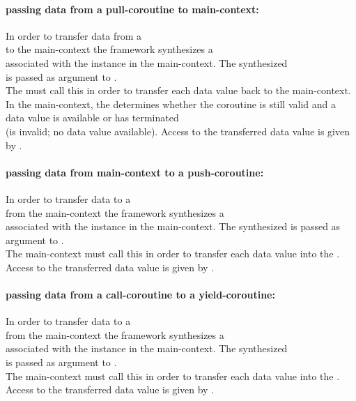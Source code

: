 \paragraph*{passing data from a pull-coroutine to main-context:}
In order to transfer data from a\\
\pullcoro to the main-context the framework synthesizes a\\
\pushcoro associated
with the \pullcoro instance in the main-context. The synthesized\\
\pushcoro is passed as argument to \corofunction.\\
The \corofunction must call this \pushcoroop in order to transfer each
data value back to the main-context.\\
In the main-context, the \pullcorobool determines whether the coroutine is still
valid and a data value is available or \corofunction has terminated\\
(\pullcoro is invalid; no data value available). Access to the transferred data
value is given by \pullcoroget.

\paragraph*{passing data from main-context to a push-coroutine:}
In order to transfer data to a\\
\pushcoro from the main-context the framework synthesizes a\\
\pullcoro associated with the \pushcoro instance in the main-context. The
synthesized \pullcoro is passed as argument to \corofunction.\\
The main-context must call this \pushcoroop in order to transfer each data value
into the \corofunction.\\
Access to the transferred data value is given by \pullcoroget.

\paragraph*{passing data from a call-coroutine to a yield-coroutine:}
In order to transfer data to a\\
\yieldcoro from the main-context the framework synthesizes a\\
\yieldcoro associated with the \callcoro instance in the main-context. The
synthesized\\
\yieldcoro is passed as argument to \corofunction.\\
The main-context must call this \callcoroop in order to transfer each data value
into the \corofunction.\\
Access to the transferred data value is given by \yieldcoroget.

